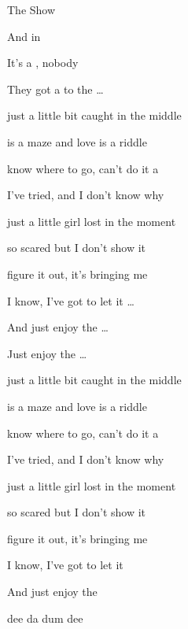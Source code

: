 \begin{SBSong}{The Show}
\begin{SBVerse}
    And  in 

    It's a , nobody 

    They got a  to the \ldots
  \end{SBVerse}
  \CBPageBrk \WBPageBrk
  \begin{minipage}[t]{0.6\textwidth}
  \begin{SBVerse}
     just a little bit caught in the middle

     is a maze and love is a riddle

     know where to go, can't do it a

    I've tried, and I don't know why
    
     just a little girl lost in the moment

     so scared but I don't show it

     figure it out, it's bringing me 
    
    I know, I've got to let it \ldots

    And just enjoy the \ldots {}

    Just enjoy the \ldots {} 
  \end{SBVerse}
  \begin{SBVerse}
    
     just a little bit caught in the middle

     is a maze and love is a riddle

     know where to go, can't do it a

    I've tried, and I don't know why


     just a little girl lost in the moment

     so scared but I don't show it

     figure it out, it's bringing me 
    
    I know, I've got to let it  
    
    And just enjoy the 
  \end{SBVerse}
  \begin{SBVerse}
     dee  da dum dee 


\end{SBVerse}
\end{minipage}
\end{SBSong}
